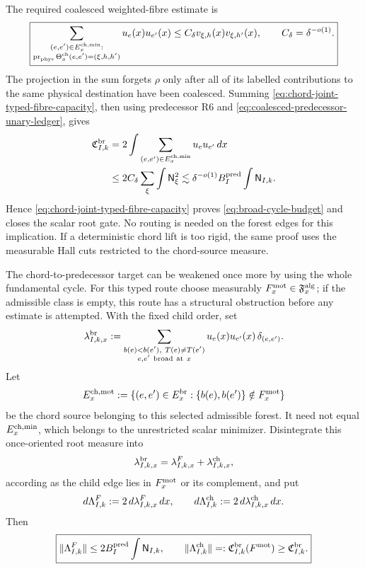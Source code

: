 \documentclass[11pt]{article}
\begin{document}
The required coalesced weighted-fibre estimate is
\begin{equation}\label{eq:chord-joint-typed-fibre-capacity}
 \boxed{
 \sum_{\substack{(e,e')\in E_x^{\rm ch,min}:\\
       \operatorname{pr}_{\rm phys}\Theta_x^{\rm ch}(e,e')
       =(\xi,h,h')}}
 u_e(x)u_{e'}(x)
 \le C_\delta v_{\xi,h}(x)v_{\xi,h'}(x),
 \qquad C_\delta=\delta^{-o(1)}.}
\end{equation}
The projection in the sum forgets \(\rho\) only after all of its labelled
contributions to the same physical destination have been coalesced.
Summing \eqref{eq:chord-joint-typed-fibre-capacity}, then using predecessor R6
and \eqref{eq:coalesced-predecessor-unary-ledger}, gives
\[
 \begin{aligned}
  \mathfrak C_{I,k}^{\rm br}
  &=2\int\sum_{(e,e')\in E_x^{\rm ch,min}}u_eu_{e'}\,dx\\
  &\le 2C_\delta\sum_\xi\int\mathsf N_\xi^2
   \lesssim
   \delta^{-o(1)}B_I^{\rm pred}
   \int\mathsf N_{I,k}.
 \end{aligned}
\]
Hence \eqref{eq:chord-joint-typed-fibre-capacity} proves
\eqref{eq:broad-cycle-budget} and closes the scalar root gate.  No routing is
needed on the forest edges for this implication.  If a deterministic chord
lift is too rigid, the same proof uses the measurable Hall cuts restricted to
the chord-source measure.

The chord-to-predecessor target can be weakened once more by using the whole
fundamental cycle.  For this typed route choose measurably
\(F_x^{\rm mot}\in\mathfrak F_x^{\rm alg}\); if the admissible class is empty,
this route has a structural obstruction before any estimate is attempted.
With the fixed child order, set
\[
 \lambda_{I,k,x}^{\rm br}
 :=
 \sum_{\substack{b(e)<b(e'),\ T(e)\ne T(e')\\
                  e,e'\ {\rm broad\ at}\ x}}
 u_e(x)u_{e'}(x)\,\delta_{(e,e')}.
\]
Let
\[
 E_x^{\rm ch,mot}
 :=\{(e,e')\in E_x^{\rm br}:
       \{b(e),b(e')\}\notin F_x^{\rm mot}\}
\]
be the chord source belonging to this selected admissible forest.  It need not
equal \(E_x^{\rm ch,min}\), which belongs to the unrestricted scalar
minimizer.  Disintegrate this once-oriented root measure into
\[
 \lambda_{I,k,x}^{\rm br}
 =\lambda_{I,k,x}^{F}+\lambda_{I,k,x}^{\rm ch},
\]
according as the child edge lies in \(F_x^{\rm mot}\) or its complement, and
put
\[
 d\Lambda_{I,k}^{F}:=2\,d\lambda_{I,k,x}^{F}\,dx,
 \qquad
 d\Lambda_{I,k}^{\rm ch}:=2\,d\lambda_{I,k,x}^{\rm ch}\,dx.
\]
Then
\begin{equation}\label{eq:forest-reservoir-capacity}
 \boxed{
 \|\Lambda_{I,k}^{F}\|
 \le 2B_I^{\rm pred}\int\mathsf N_{I,k},
 \qquad
 \|\Lambda_{I,k}^{\rm ch}\|
 =:\mathfrak C_{I,k}^{\rm br}(F^{\rm mot})
 \ge\mathfrak C_{I,k}^{\rm br}.}
\end{equation}
\end{document}

